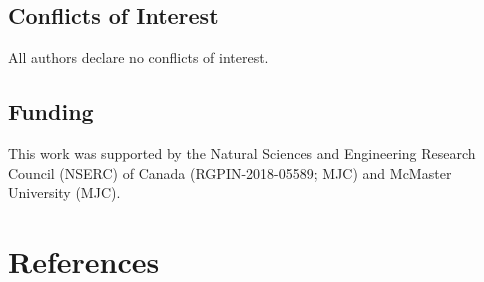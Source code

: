 \documentclass[
  doc, donotrepeattitle,floatsintext]{apa7}
\begin{document}
\hypertarget{conflicts-of-interest}{%
\subsection{Conflicts of Interest}\label{conflicts-of-interest}}

\noindent All authors declare no conflicts of interest.

\hypertarget{funding}{%
\subsection{Funding}\label{funding}}

\noindent This work was supported by the Natural Sciences and Engineering Research Council (NSERC) of Canada (RGPIN-2018-05589; MJC) and McMaster University (MJC).

\pagebreak

\hypertarget{references}{%
\section{References}\label{references}}

\vspace{2ex}
\end{document}
